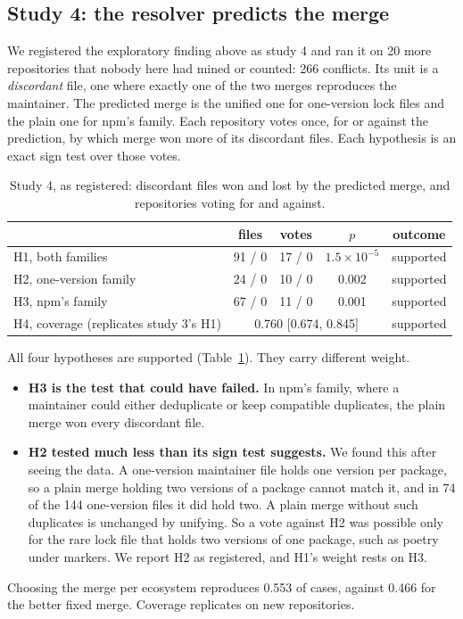 \documentclass[11pt]{article}
\begin{document}
\subsection{Study 4: the resolver predicts the merge}

We registered the exploratory finding above as study 4 and ran it on 20 more repositories that
nobody here had mined or counted: 266 conflicts. Its unit is a \emph{discordant} file, one where
exactly one of the two merges reproduces the maintainer. The predicted merge is the unified one
for one-version lock files and the plain one for npm's family. Each repository votes once, for or
against the prediction, by which merge won more of its discordant files. Each hypothesis is an
exact sign test over those votes.

\begin{table}[h]
\centering
\caption{Study 4, as registered: discordant files won and lost by the predicted merge, and
repositories voting for and against.}
\label{tab:study4}
\small
\begin{tabular}{lcccc}
\toprule
& files & votes & $p$ & outcome \\
\midrule
H1, both families & 91 / 0 & 17 / 0 & $1.5\times10^{-5}$ & supported \\
H2, one-version family & 24 / 0 & 10 / 0 & 0.002 & supported \\
H3, npm's family & 67 / 0 & 11 / 0 & 0.001 & supported \\
H4, coverage (replicates study 3's H1) & \multicolumn{3}{c}{0.760 [0.674, 0.845]} & supported \\
\bottomrule
\end{tabular}
\end{table}

All four hypotheses are supported (Table~\ref{tab:study4}). They carry different weight.
\begin{itemize}
  \item \textbf{H3 is the test that could have failed.} In npm's family, where a maintainer could
  either deduplicate or keep compatible duplicates, the plain merge won every discordant file.
  \item \textbf{H2 tested much less than its sign test suggests.} We found this after seeing the
  data. A one-version maintainer file holds one version per package, so a plain merge holding two
  versions of a package cannot match it, and in 74 of the 144 one-version files it did hold two.
  A plain merge without such duplicates is unchanged by unifying. So a vote against H2 was
  possible only for the rare lock file that holds two versions of one package, such as poetry
  under markers. We report H2 as registered, and H1's weight rests on H3.
\end{itemize}
Choosing the merge per ecosystem reproduces 0.553 of cases, against 0.466 for the better fixed
merge. Coverage replicates on new repositories.
\end{document}
